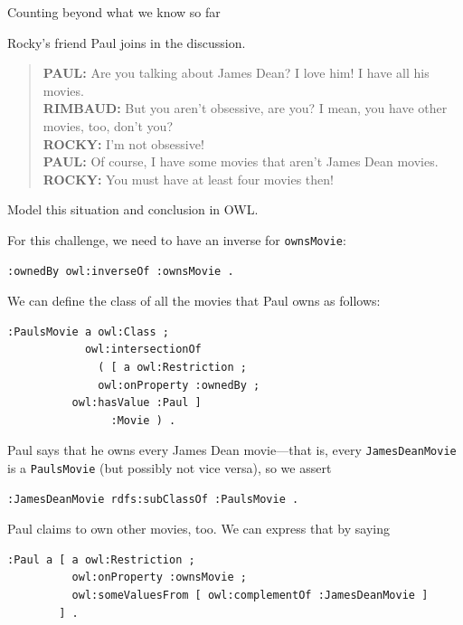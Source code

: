 \begin{challenge}{Counting beyond what we know so far}
\label{chal:35}

Rocky's friend Paul joins in the discussion.

\begin{quote}
\textbf{PAUL:} Are you talking about James Dean? I love him! I have all his
movies. \\
\textbf{RIMBAUD:} But you aren't obsessive, are you? I mean, you have other
movies, too, don't you?  \\
\textbf{ROCKY:} I'm not obsessive! \\
\textbf{PAUL:} Of course, I have some movies that aren't James Dean movies. \\
\textbf{ROCKY:} You must have at least four movies then! 
\end{quote}

Model this situation and conclusion in OWL.

\solution

For this challenge, we need to have an inverse for \texttt{ownsMovie}:

\begin{lstlisting}
:ownedBy owl:inverseOf :ownsMovie .
\end{lstlisting}

We can define the class of all the movies that Paul owns as follows:

\begin{lstlisting}
:PaulsMovie a owl:Class ;
            owl:intersectionOf
              ( [ a owl:Restriction ;
	          owl:onProperty :ownedBy ;
		  owl:hasValue :Paul ]
                :Movie ) .
\end{lstlisting}

Paul says that he owns every James Dean movie---that is, every
\texttt{JamesDeanMovie} is a \texttt{PaulsMovie}
(but possibly not vice versa), so we assert

\begin{lstlisting}
:JamesDeanMovie rdfs:subClassOf :PaulsMovie .
\end{lstlisting}

Paul claims to own other movies, too. We can express that by saying

\begin{lstlisting}
:Paul a [ a owl:Restriction ;
          owl:onProperty :ownsMovie ;
          owl:someValuesFrom [ owl:complementOf :JamesDeanMovie ] 
        ] .
\end{lstlisting}


\end{challenge}
